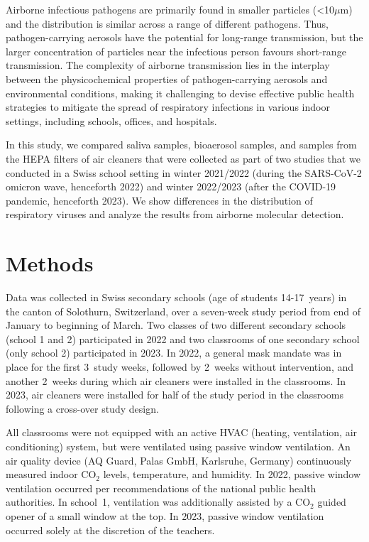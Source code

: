 \documentclass[fleqn,11pt]{wlscirep}
\begin{document}
Airborne infectious pathogens are primarily found in smaller particles (<10$\mu$m) and the distribution is similar across a range of different pathogens\cite{Fennelly2020}. Thus, pathogen-carrying aerosols have the potential for long-range transmission, but the larger concentration of particles near the infectious person favours short-range transmission\cite{Tellier2009JTRSI,Wang2020}. The complexity of airborne transmission lies in the interplay between the physicochemical properties of pathogen-carrying aerosols and environmental conditions\cite{Wang2021}, making it challenging to devise effective public health strategies to mitigate the spread of respiratory infections in various indoor settings, including schools, offices, and hospitals.

In this study, we compared saliva samples, bioaerosol samples, and samples from the HEPA filters of air cleaners that were collected as part of two studies that we conducted in a Swiss school setting in winter 2021/2022 (during the SARS-CoV-2 omicron wave, henceforth 2022)\cite{Banholzer2023PLoSMed} and winter 2022/2023 (after the COVID-19 pandemic, henceforth 2023)\cite{Banholzer2023submitted}. We show differences in the distribution of respiratory viruses and analyze the results from airborne molecular detection. 


\section*{Methods}

Data was collected in Swiss secondary schools (age of students 14-17~years) in the canton of Solothurn, Switzerland, over a seven-week study period from end of January to beginning of March. Two classes of two different secondary schools (school 1 and 2) participated in 2022 and two classrooms of one secondary school (\ie only school 2) participated in 2023. In 2022, a general mask mandate was in place for the first 3~study weeks, followed by 2~weeks without intervention, and another 2~weeks during which air cleaners were installed in the classrooms. In 2023, air cleaners were installed for half of the study period in the classrooms following a cross-over study design. 

All classrooms were not equipped with an active HVAC (heating, ventilation, air conditioning) system, but were ventilated using passive window ventilation. An air quality device (AQ Guard, Palas GmbH, Karlsruhe, Germany) continuously measured indoor CO$_2$ levels, temperature, and humidity. In 2022, passive window ventilation occurred per recommendations of the national public health authorities. In school~1, ventilation was additionally assisted by a CO$_2$ guided opener of a small window at the top. In 2023, passive window ventilation occurred solely at the discretion of the teachers. 
\end{document}
